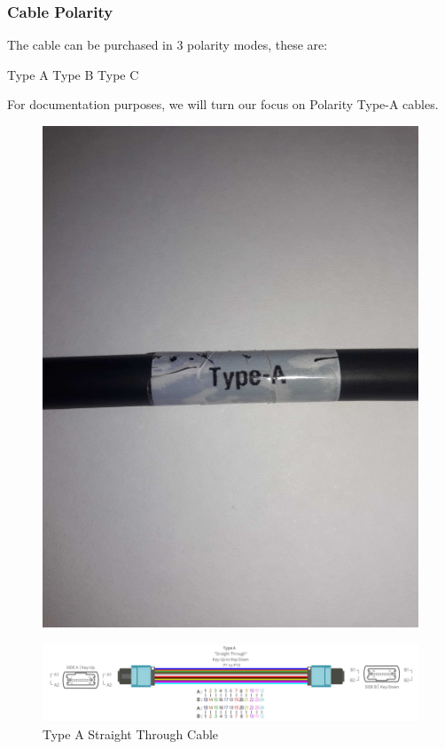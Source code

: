 \subsubsection{Cable Polarity}

The cable can be purchased in 3 polarity modes, these are:

    Type A
    Type B
    Type C

For documentation purposes, we will turn our focus on Polarity Type-A cables.


\begin{figure}
  \includegraphics[width=\textwidth]{images/66.jpg}
  \label{fig:jlsimon}
\end{figure}

\begin{figure}
  \includegraphics[width=\textwidth]{images/7.png}
  \caption{Type A Straight Through Cable}
  \label{fig:jlsimon}
\end{figure}

